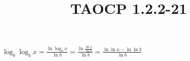 \documentclass{article}
\title{TAOCP 1.2.2\mbox{-}21}
\begin{document}
\maketitle

\( \log_b{\log_b{x}} = \frac{\ln{\log_b{x}}}{\ln{b}} = \frac{\ln{\frac{\ln{x}}{\ln{b}}}}{\ln{b}} = \frac{\ln{\ln{x}} - \ln{\ln{b}}}{\ln{b}} \)
\end{document}
